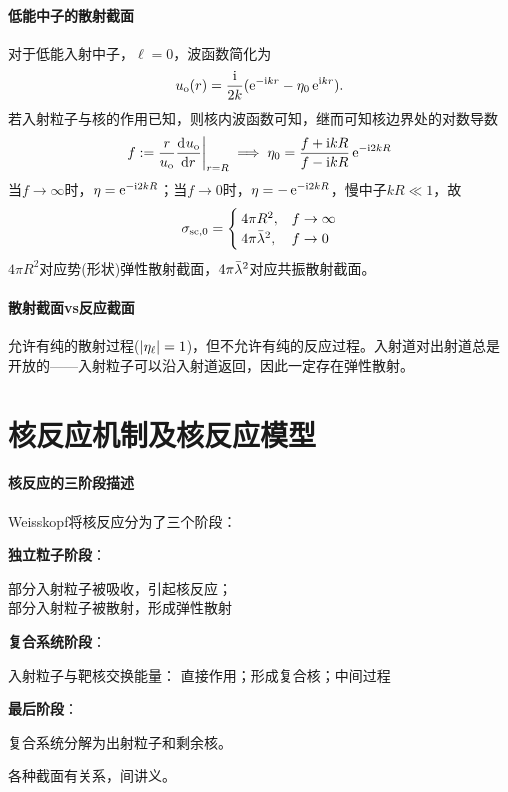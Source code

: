 \paragraph{低能中子的散射截面}对于低能入射中子，$\ell = 0$，波函数简化为
\[
	u_{\mathrm o}(r) = \frac{\mathrm{i}}{2k}(\mathop{}\!\mathrm{e}^{-\mathrm{i} kr} - \eta_0\mathop{}\!\mathrm{e}^{\mathrm{i} kr}).
\]
若入射粒子与核的作用已知，则核内波函数可知，继而可知核边界处的对数导数
\[
	f := {\frac r{u_{\mathrm o}}\frac{\mathop{}\!\mathrm{d}^{}u_{\mathrm o}}{\mathrm{d}{r}^{}}}\biggr\rvert_{r=R} \implies \eta_0 = \frac{f + \mathrm{i} kR}{f - \mathrm{i} kR}\mathop{}\!\mathrm{e}^{-\mathrm{i}2kR}
\]
当$f \to \infty$时，$\eta = \mathop{}\!\mathrm{e}^{-\mathrm{i}2kR}$；当$f \to 0$时，$\eta = -\mathop{}\!\mathrm{e}^{-\mathrm{i}2kR}$，慢中子$kR \ll 1$，故
\begin{align}
	\sigma_{\mathrm{sc},0} = \begin{cases}
		4\pi R^2,&f \to \infty\\
		4\pi\bar{\lambda}^2,&f \to 0
	\end{cases}
\end{align}
$4\pi R^2$对应势(形状)弹性散射截面，$4\pi\bar{\lambda}^2$对应共振散射截面。
\paragraph{散射截面vs反应截面}
\begin{notecaptionblock}
\end{notecaptionblock}
允许有纯的散射过程($\lvert\eta_\ell\rvert = 1$)，但不允许有纯的反应过程。入射道对出射道总是开放的——入射粒子可以沿入射道返回，因此一定存在弹性散射。
\section{核反应机制及核反应模型}
\paragraph{核反应的三阶段描述}Weisskopf将核反应分为了三个阶段：
\begin{compactenum}
	\item \textbf{独立粒子阶段}：
	
	部分入射粒子被吸收，引起核反应；\\
	部分入射粒子被散射，形成弹性散射
	\item \textbf{复合系统阶段}：
	
	入射粒子与靶核交换能量：
	直接作用；形成复合核；中间过程
	\item \textbf{最后阶段}：
	
	复合系统分解为出射粒子和剩余核。
\end{compactenum}
各种截面有关系，间讲义。
